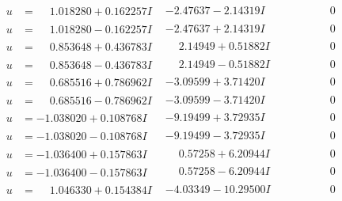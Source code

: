 \documentclass[1p]{elsarticle_modified}
\theoremstyle{definition}
\begin{document}
$$\begin{array}{c|c|c}
\begin{aligned}
u &= \phantom{-}1.018280 + 0.162257 I\end{aligned}
 & -2.47637 - 2.14319 I & \phantom{-0.000000 } 0 \\ \hline\begin{aligned}
u &= \phantom{-}1.018280 - 0.162257 I\end{aligned}
 & -2.47637 + 2.14319 I & \phantom{-0.000000 } 0 \\ \hline\begin{aligned}
u &= \phantom{-}0.853648 + 0.436783 I\end{aligned}
 & \phantom{-}2.14949 + 0.51882 I & \phantom{-0.000000 } 0 \\ \hline\begin{aligned}
u &= \phantom{-}0.853648 - 0.436783 I\end{aligned}
 & \phantom{-}2.14949 - 0.51882 I & \phantom{-0.000000 } 0 \\ \hline\begin{aligned}
u &= \phantom{-}0.685516 + 0.786962 I\end{aligned}
 & -3.09599 + 3.71420 I & \phantom{-0.000000 } 0 \\ \hline\begin{aligned}
u &= \phantom{-}0.685516 - 0.786962 I\end{aligned}
 & -3.09599 - 3.71420 I & \phantom{-0.000000 } 0 \\ \hline\begin{aligned}
u &= -1.038020 + 0.108768 I\end{aligned}
 & -9.19499 + 3.72935 I & \phantom{-0.000000 } 0 \\ \hline\begin{aligned}
u &= -1.038020 - 0.108768 I\end{aligned}
 & -9.19499 - 3.72935 I & \phantom{-0.000000 } 0 \\ \hline\begin{aligned}
u &= -1.036400 + 0.157863 I\end{aligned}
 & \phantom{-}0.57258 + 6.20944 I & \phantom{-0.000000 } 0 \\ \hline\begin{aligned}
u &= -1.036400 - 0.157863 I\end{aligned}
 & \phantom{-}0.57258 - 6.20944 I & \phantom{-0.000000 } 0 \\ \hline\begin{aligned}
u &= \phantom{-}1.046330 + 0.154384 I\end{aligned}
 & -4.03349 - 10.29500 I & \phantom{-0.000000 } 0 \\ \hline\begin{aligned}

\end{aligned}
\end{array}$$
\end{document}
